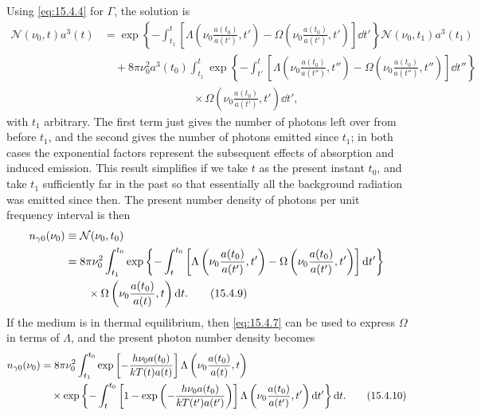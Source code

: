 Using \eqref{eq:15.4.4} for \(\Gamma\), the solution is
\begin{align*}
  \mathcal N(\nu_0,t)a^3(t)
  &=
  \exp\left\{
    -\int_{t_1}^{t}
    \left[
      \Lambda\left(\nu_0\frac{a(t_0)}{a(t')},t'\right)
      -
      \Omega\left(\nu_0\frac{a(t_0)}{a(t')},t'\right)
    \right]\dd t'
  \right\}
  \mathcal N(\nu_0,t_1)a^3(t_1)
  \\
  &\quad+
  8\pi\nu_0^2a^3(t_0)
  \int_{t_1}^{t}
  \exp\left\{
    -\int_{t'}^{t}
    \left[
      \Lambda\left(\nu_0\frac{a(t_0)}{a(t'')},t''\right)
      -
      \Omega\left(\nu_0\frac{a(t_0)}{a(t'')},t''\right)
    \right]\dd t''
  \right\}
  \\
  &\hspace{8em}\times
  \Omega\left(\nu_0\frac{a(t_0)}{a(t')},t'\right)\dd t',
\end{align*}
with \(t_1\) arbitrary. The first term just gives the number of photons left
over from before \(t_1\), and the second gives the number of photons emitted
since \(t_1\); in both cases the exponential factors represent the subsequent
effects of absorption and induced emission. This result simplifies if we take
\(t\) as the present instant \(t_0\), and take \(t_1\) sufficiently far in the
past so that essentially all the background radiation was emitted since then.
The present number density of photons per unit frequency interval is then
\begin{align}
  n_{\gamma0}(\nu_0)
  &\equiv\mathcal N(\nu_0,t_0)
  \notag\\
  &=
  8\pi\nu_0^2
  \int_{t_1}^{t_0}
  \exp\left\{
    -\int_t^{t_0}
    \left[
      \Lambda\left(\nu_0\frac{a(t_0)}{a(t')},t'\right)
      -
      \Omega\left(\nu_0\frac{a(t_0)}{a(t')},t'\right)
    \right]\mathop{}\!\mathrm{d} t'
  \right\}
  \notag\\
  &\qquad\times
  \Omega\left(\nu_0\frac{a(t_0)}{a(t)},t\right)\mathop{}\!\mathrm{d} t.
  \tag{15.4.9}\label{eq:15.4.9}
\end{align}
If the medium is in thermal equilibrium, then \eqref{eq:15.4.7} can be used to
express \(\Omega\) in terms of \(\Lambda\), and the present photon number
density becomes
\begin{align}
  n_{\gamma0}(\nu_0)
  &=
  8\pi\nu_0^2
  \int_{t_1}^{t_0}
  \exp\left[
    -\frac{h\nu_0a(t_0)}{kT(t)a(t)}
  \right]
  \Lambda\left(\nu_0\frac{a(t_0)}{a(t)},t\right)
  \notag\\
  &\quad\times
  \exp\left\{
    -\int_t^{t_0}
    \left[
      1-\exp\left(
        -\frac{h\nu_0a(t_0)}{kT(t')a(t')}
      \right)
    \right]
    \Lambda\left(\nu_0\frac{a(t_0)}{a(t')},t'\right)\mathop{}\!\mathrm{d} t'
  \right\}\mathop{}\!\mathrm{d} t.
  \tag{15.4.10}\label{eq:15.4.10}
\end{align}

